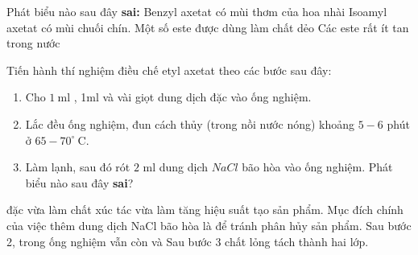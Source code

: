 \begin{vdex}
	Phát biểu nào sau đây \textbf{sai:}
	\choice
	{%
	    Benzyl axetat có mùi thơm của hoa nhài
	}
	{%
		Isoamyl axetat có mùi chuối chín.
	}
	{%
		\True Một số este được dùng làm chất dẻo
	}
	{%
		Các este rất ít tan trong nước
	}
		\huongdan{%
		
	}
\end{vdex}
\begin{vdex}
	Tiến hành thí nghiệm điều chế etyl axetat theo các bước sau đây:
	\begin{enumerate}[label= \itshape\protect\bfseries{Bước \arabic*}:,wide=0cm,leftmargin=0cm]	
		\item Cho $ 1~\mathrm{ml} $ , 1ml  và vài giọt dung dịch  đặc vào ống nghiệm.
		\item Lắc đều ống nghiệm, đun cách thủy (trong nồi nước nóng) khoảng $ 5-6 $ phút ở $ 65-70^\circ~\mathrm{C} $.
		\item Làm lạnh, sau đó rót $ 2  $	ml dung dịch $ NaCl $ bão hòa	vào ống nghiệm. Phát biểu nào sau đây \textbf{sai}?
	\end{enumerate}
	\choice
	{%
		 đặc vừa làm chất xúc tác vừa làm tăng hiệu suất tạo sản phẩm.
	}
	{%
		\True Mục đích chính của việc thêm dung dịch NaCl bão hòa là để tránh phân hủy sản phẩm.
	}
	{%
		Sau bước 2, trong ống nghiệm vẫn còn  và 
	}
	{%
		Sau bước 3 chất lỏng tách thành hai lớp.
	}
		\huongdan{%
		
	}
\end{vdex}


